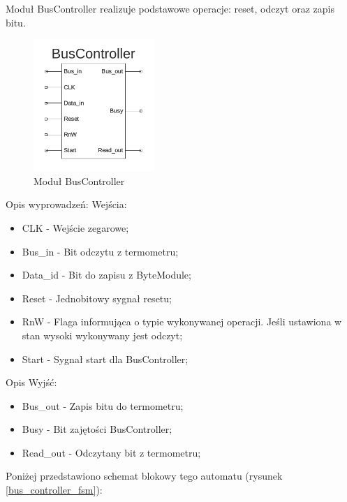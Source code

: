 \documentclass[a4paper]{article}
\begin{document}
Moduł BusController realizuje podstawowe operacje: reset, odczyt oraz zapis bitu.  

\begin{figure}[H]
\begin{center}
\includegraphics[height=5cm]{graphics/bus_controller_sym.png}
\end{center}
\caption{Moduł BusController}
\label{bus_controller_sym}
\end{figure}

Opis wyprowadzeń:
Wejścia:
\begin{itemize}
\item CLK - Wejście zegarowe;
\item Bus\_in - Bit odczytu z termometru;
\item Data\_id - Bit do zapisu z ByteModule;
\item Reset - Jednobitowy sygnał resetu;
\item RnW - Flaga informująca o typie wykonywanej operacji. Jeśli ustawiona w stan wysoki wykonywany jest odczyt;
\item Start - Sygnał start dla BusController;
\end{itemize}

Opis Wyjść: 
\begin{itemize}
\item Bus\_out - Zapis bitu do termometru; 
\item Busy - Bit zajętości BusController;
\item Read\_out -  Odczytany bit z termometru;
\end{itemize}

Poniżej przedstawiono schemat blokowy tego automatu (rysunek \ref{bus_controller_fsm}):
\end{document}
